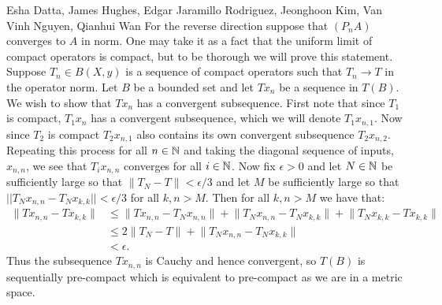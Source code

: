 \begin{solution}{Esha Datta, James Hughes, Edgar Jaramillo Rodriguez, Jeonghoon Kim, Van Vinh Nguyen, Qianhui Wan}
        For the reverse direction suppose that $(P_nA)$ converges to $A$ in norm.
        One may take it as a fact that the uniform limit of compact operators is compact, but to be thorough we will prove this statement.
        Suppose $T_n\in B(X,y)$ is a sequence of compact operators such that $T_n \to T$ in the operator norm.
        Let $B$ be a bounded set and let $Tx_n$ be a sequence in $T(B)$.
        We wish to show that $Tx_n$ has a convergent subsequence.
        First note that since $T_1$ is compact, $T_1x_n$ has a convergent subsequence, which we will denote $T_1x_{n,1}$.
        Now since $T_2$ is compact $T_2x_{n,1}$ also contains its own convergent subsequence $T_2x_{n,2}$.
        Repeating this process for all $n\in \mathbb{N}$ and taking the diagonal sequence of inputs, $x_{n,n}$, we see that $T_ix_{n,n}$ converges for all $i\in \mathbb{N}$.
        Now fix $\epsilon >0$ and let $N\in\mathbb{N}$ be sufficiently large so that $\lVert T_N -T \rVert <\epsilon/3$ and let $M$ be sufficiently large so that $||T_Nx_{n,n}- T_Nx_{k,k}|| < \epsilon/3$ for all $k,n > M$.
        Then for all $k,n>M$ we have that:
        \begin{equation*}
            \begin{split}
                \lVert Tx_{n,n}-Tx_{k,k} \rVert
                &\leq \lVert Tx_{n,n}-T_Nx_{n,n} \rVert + \lVert T_Nx_{n,n} -T_Nx_{k,k} \rVert + \lVert T_Nx_{k,k}-Tx_{k,k} \rVert \\
                &\leq 2\lVert T_N -T \rVert + \lVert T_Nx_{n,n} -T_Nx_{k,k} \rVert \\
                &< \epsilon.
            \end{split}
        \end{equation*}
        Thus the subsequence $Tx_{n,n}$ is Cauchy and hence convergent, so $T(B)$ is sequentially pre-compact which is equivalent to pre-compact as we are in a metric space.
\end{solution}

